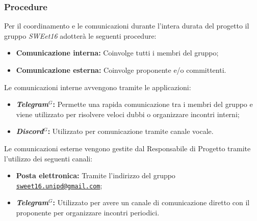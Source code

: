         \subsubsection{Procedure}


            Per il coordinamento e le comunicazioni durante l'intera durata del progetto il gruppo \textit{SWEet16} adotterà le seguenti procedure:
            \begin{itemize}
                \item \textbf{Comunicazione interna:} Coinvolge tutti i membri del gruppo;
                \item \textbf{Comunicazione esterna:} Coinvolge proponente e/o committenti.
            \end{itemize}


            Le comunicazioni interne avvengono tramite le applicazioni:
            \begin{itemize}
                \item \textbf{\emph{Telegram}$^{G}$:} Permette una rapida comunicazione tra i membri del gruppo e viene utilizzato per risolvere veloci dubbi o organizzare incontri interni;
                \item \textbf{\emph{Discord}$^{G}$:} Utilizzato per comunicazione tramite canale vocale.
            \end{itemize}


            Le comunicazioni esterne vengono gestite dal Responsabile di Progetto tramite l'utilizzo dei seguenti canali:
            \begin{itemize}
                \item \textbf{Posta elettronica:} Tramite l'indirizzo del gruppo \href{mailto:sweet16.unipd@gmail.com}{\nolinkurl{sweet16.unipd@gmail.com}};
                \item \textbf{\emph{Telegram}$^{G}$:} Utilizzato per avere un canale di comunicazione diretto con il proponente per organizzare incontri periodici.
            \end{itemize}



